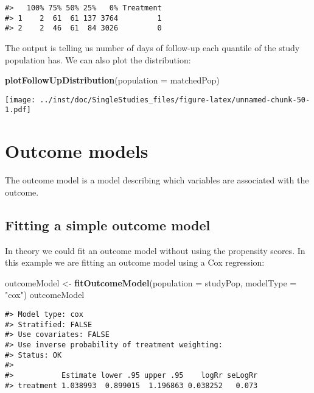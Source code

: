 \documentclass[]{article}
\newenvironment{Shaded}{\begin{snugshade}}{\end{snugshade}}
\newcommand{\DataTypeTok}[1]{\textcolor[rgb]{0.13,0.29,0.53}{#1}}
\newcommand{\KeywordTok}[1]{\textcolor[rgb]{0.13,0.29,0.53}{\textbf{#1}}}
\newcommand{\NormalTok}[1]{#1}
\newcommand{\StringTok}[1]{\textcolor[rgb]{0.31,0.60,0.02}{#1}}
\begin{document}
\begin{verbatim}
#>   100% 75% 50% 25%   0% Treatment
#> 1    2  61  61 137 3764         1
#> 2    2  46  61  84 3026         0
\end{verbatim}

The output is telling us number of days of follow-up each quantile of
the study population has. We can also plot the distribution:

\begin{Shaded}
\begin{Highlighting}[]
\KeywordTok{plotFollowUpDistribution}\NormalTok{(}\DataTypeTok{population =}\NormalTok{ matchedPop)}
\end{Highlighting}
\end{Shaded}

\texttt{[image: ../inst/doc/SingleStudies\_files/figure-latex/unnamed-chunk-50-1.pdf]}

\hypertarget{outcome-models}{%
\section{Outcome models}\label{outcome-models}}

The outcome model is a model describing which variables are associated
with the outcome.

\hypertarget{fitting-a-simple-outcome-model}{%
\subsection{Fitting a simple outcome
model}\label{fitting-a-simple-outcome-model}}

In theory we could fit an outcome model without using the propensity
scores. In this example we are fitting an outcome model using a Cox
regression:

\begin{Shaded}
\begin{Highlighting}[]
\NormalTok{outcomeModel <-}\StringTok{ }\KeywordTok{fitOutcomeModel}\NormalTok{(}\DataTypeTok{population =}\NormalTok{ studyPop,}
                                \DataTypeTok{modelType =} \StringTok{"cox"}\NormalTok{)}
\NormalTok{outcomeModel}
\end{Highlighting}
\end{Shaded}

\begin{verbatim}
#> Model type: cox
#> Stratified: FALSE
#> Use covariates: FALSE
#> Use inverse probability of treatment weighting: 
#> Status: OK
#> 
#>           Estimate lower .95 upper .95    logRr seLogRr
#> treatment 1.038993  0.899015  1.196863 0.038252   0.073
\end{verbatim}
\end{document}

